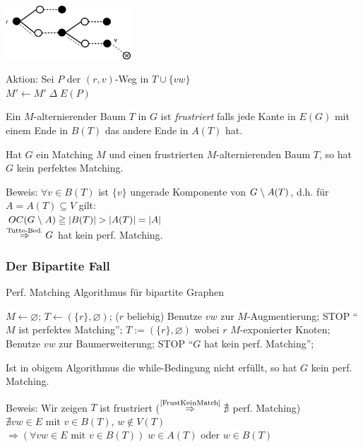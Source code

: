 \includegraphics[height=2cm]{bilder/5-2vwAugment}

Aktion: Sei $P$ der $(r,v)$-Weg in $T \cup \{v w\}$\\
$M' \leftarrow M' \; \Delta \; E(P)$

Ein $M$-alternierender Baum $T$ in $G$ ist {\em frustriert} falls jede
Kante in $E(G)$ mit einem Ende in $B(T)$ das andere Ende in $A(T)$ hat.

\begin{lemma} \label{FrustKeinMatch}
Hat $G$ ein Matching $M$ und einen frustrierten $M$-alternierenden Baum
$T$, so hat $G$ kein perfektes Matching.
\end{lemma}
Beweis: $\forall v \in B(T)$ ist $\{v\}$ ungerade Komponente von $G\;\backslash\;
A(T)$, d.h. für $A=A(T) \subseteq V$ gilt:\\
$OC(G\;\backslash\; A) \geqq |B(T)| > |A(T)| = |A|$\\
$\stackrel{\mbox{\scriptsize Tutte-Bed.}}{\Rightarrow} G$ hat kein perf. Matching. 
\subsubsection{Der Bipartite Fall}

Perf. Matching Algorithmus für bipartite Graphen
\begin{algorithmic}
\STATE $M \leftarrow \varnothing$;
\STATE $T \leftarrow (\{r\}, \varnothing)$; ($r$ beliebig)
\STATE Benutze $v w$ zur $M$-Augmentierung;
\STATE STOP "`$M$ ist perfektes Matching"';
\ELSE 
\STATE $T:=(\{r\},\varnothing)$ wobei $r$ $M$-exponierter Knoten;
\ENDIF
\ELSE 
\STATE Benutze $v w$ zur Baumerweiterung;
\ENDIF
\ENDWHILE
\STATE STOP "`$G$ hat kein perf. Matching"';
\end{algorithmic}

\begin{lemma}
Ist in obigem Algorithmus die while-Bedingung nicht erfüllt, so hat $G$
kein perf. Matching.
\end{lemma}
Beweis: Wir zeigen $T$ ist frustriert ($\stackrel{\mbox{\scriptsize
\ref{FrustKeinMatch}}}{\Rightarrow} \nexists$ perf. Matching)\\
$\nexists v w \in E \mbox{ mit } v \in B(T)$, $w \not\in V(T)$\\
$\Rightarrow (\forall v w  \in E \mbox{ mit } v \in B(T)) \; w \in A(T)$
oder $w \in B(T)$

